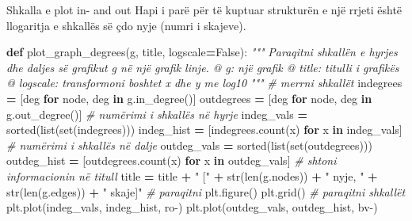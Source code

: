 \documentclass[
  ignorenonframetext,
]{beamer}
\newenvironment{Shaded}{\begin{snugshade}}{\end{snugshade}}
\newcommand{\BuiltInTok}[1]{#1}
\newcommand{\CommentTok}[1]{\textcolor[rgb]{0.56,0.35,0.01}{\textit{#1}}}
\newcommand{\ControlFlowTok}[1]{\textcolor[rgb]{0.13,0.29,0.53}{\textbf{#1}}}
\newcommand{\KeywordTok}[1]{\textcolor[rgb]{0.13,0.29,0.53}{\textbf{#1}}}
\newcommand{\NormalTok}[1]{#1}
\newcommand{\OperatorTok}[1]{\textcolor[rgb]{0.81,0.36,0.00}{\textbf{#1}}}
\newcommand{\StringTok}[1]{\textcolor[rgb]{0.31,0.60,0.02}{#1}}
\newcommand{\VariableTok}[1]{\textcolor[rgb]{0.00,0.00,0.00}{#1}}
\begin{document}
\begin{frame}[fragile]{Shkalla e plot in- and out}
\protect\hypertarget{shkalla-e-plot-in--and-out}{}
Hapi i parë për të kuptuar strukturën e një rrjeti është llogaritja e
shkallës së çdo nyje (numri i skajeve).


\begin{Shaded}
\begin{Highlighting}[]
\KeywordTok{def}\NormalTok{ plot\_graph\_degrees(g, title, logscale}\OperatorTok{=}\VariableTok{False}\NormalTok{):}
    \CommentTok{"""}
\CommentTok{    Paraqitni shkallën e hyrjes dhe daljes së grafikut g në një grafik linje.}
\CommentTok{    @ g: një grafik}
\CommentTok{    @ title: titulli i grafikës}
\CommentTok{    @ logscale: transformoni boshtet x dhe y me log10}
\CommentTok{    """}
    \CommentTok{\# merrni shkallët}
\NormalTok{    indegrees }\OperatorTok{=}\NormalTok{ [deg }\ControlFlowTok{for}\NormalTok{ node, deg }\KeywordTok{in}\NormalTok{ g.in\_degree()]}
\NormalTok{    outdegrees }\OperatorTok{=}\NormalTok{ [deg }\ControlFlowTok{for}\NormalTok{ node, deg }\KeywordTok{in}\NormalTok{ g.out\_degree()]}
    \CommentTok{\# numërimi i shkallës në hyrje}
\NormalTok{    indeg\_vals }\OperatorTok{=} \BuiltInTok{sorted}\NormalTok{(}\BuiltInTok{list}\NormalTok{(}\BuiltInTok{set}\NormalTok{(indegrees)))}
\NormalTok{    indeg\_hist }\OperatorTok{=}\NormalTok{ [indegrees.count(x) }\ControlFlowTok{for}\NormalTok{ x }\KeywordTok{in}\NormalTok{ indeg\_vals]}
    \CommentTok{\# numërimi i shkallës në dalje}
\NormalTok{    outdeg\_vals }\OperatorTok{=} \BuiltInTok{sorted}\NormalTok{(}\BuiltInTok{list}\NormalTok{(}\BuiltInTok{set}\NormalTok{(outdegrees)))}
\NormalTok{    outdeg\_hist }\OperatorTok{=}\NormalTok{ [outdegrees.count(x) }\ControlFlowTok{for}\NormalTok{ x }\KeywordTok{in}\NormalTok{ outdeg\_vals]}
    \CommentTok{\# shtoni informacionin në titull}
\NormalTok{    title }\OperatorTok{=}\NormalTok{ title }\OperatorTok{+} \StringTok{" ["} \OperatorTok{+} \BuiltInTok{str}\NormalTok{(}\BuiltInTok{len}\NormalTok{(g.nodes)) }\OperatorTok{+} \StringTok{" nyje, "} \OperatorTok{+} \BuiltInTok{str}\NormalTok{(}\BuiltInTok{len}\NormalTok{(g.edges)) }\OperatorTok{+} \StringTok{" skaje]"}
    \CommentTok{\# paraqitni}
\NormalTok{    plt.figure()}
\NormalTok{    plt.grid()}
    \CommentTok{\# paraqitni shkallët}
\NormalTok{    plt.plot(indeg\_vals, indeg\_hist, }\StringTok{\textquotesingle{}ro{-}\textquotesingle{}}\NormalTok{)}
\NormalTok{    plt.plot(outdeg\_vals, outdeg\_hist, }\StringTok{\textquotesingle{}bv{-}\textquotesingle{}}\NormalTok{)}
\end{Highlighting}
\end{Shaded}
\end{frame}
\end{document}
